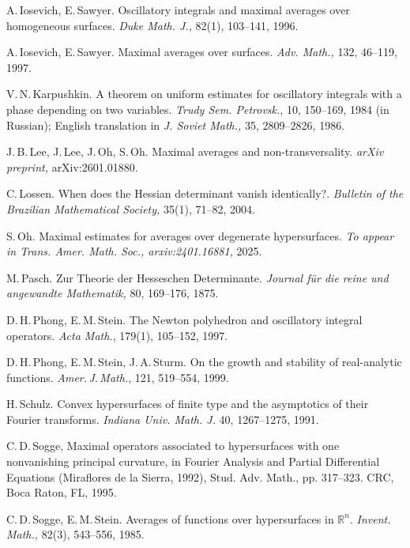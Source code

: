 \documentclass[a4paper, 11pt]{article}
\theoremstyle{plain}
\theoremstyle{definition}
\theoremstyle{lemma}
\theoremstyle{Remark}
\theoremstyle{proposition}
\theoremstyle{corollary}
\theoremstyle{example}
\theoremstyle{assumption}
\begin{document}
\begin{thebibliography}{}
 A.\,Iosevich, E.\,Sawyer. Oscillatory integrals and maximal averages over homogeneous surfaces. \textit{Duke Math. J.,} 82(1), 103--141, 1996.


 A.\,Iosevich,  E.\,Sawyer. Maximal averages over surfaces. \textit{Adv. Math.,} 132, 46--119, 1997.

 V.\,N.\,Karpushkin. A theorem on uniform estimates for oscillatory integrals with a phase depending on two variables. \textit{Trudy Sem. Petrovsk.}, 10, 150--169, 1984 (in Russian); English translation
in \textit{J. Soviet Math.,} 35, 2809--2826, 1986.


 J.\,B.\,Lee, J.\,Lee, J.\,Oh, S.\,Oh. Maximal averages and non-transversality. \textit{arXiv preprint,} arXiv:2601.01880.

 C.\,Lossen.  When does the Hessian determinant vanish identically?.
\textit{ Bulletin of the
Brazilian Mathematical Society,} 35(1), 71--82, 2004.

 S.\,Oh. Maximal estimates for averages over degenerate hypersurfaces. \textit{To appear in Trans. Amer. Math. Soc., arxiv:2401.16881,} 2025.


 M.\,Pasch. Zur Theorie der Hesseschen Determinante. \textit{ Journal f\"ur die reine und angewandte Mathematik,} 80, 169--176, 1875.

 D.\,H.\,Phong, E.\,M.\,Stein. The Newton polyhedron and oscillatory integral operators. \textit{Acta Math.}, 179(1), 105--152, 1997.

D.\,H.\,Phong, E.\,M.\,Stein,  J.\,A.\,Sturm. On the growth and stability of real-analytic
functions. \textit{Amer.\,J.\,Math.}, 121, 519--554, 1999.

 H.\,Schulz. Convex hypersurfaces of finite type and the asymptotics of their Fourier transforms. \textit{Indiana Univ. Math. J.} 40, 1267--1275, 1991.

 C.\,D.\,Sogge,  Maximal operators associated to hypersurfaces with one nonvanishing principal curvature,
in Fourier Analysis and Partial Differential Equations (Miraflores de la Sierra,
1992), Stud. Adv. Math., pp. 317--323. CRC, Boca Raton, FL, 1995.

 C.\,D.\,Sogge, E.\,M.\,Stein. Averages of functions over hypersurfaces in $\mathbb{R}^n.$  \textit{Invent. Math.,}
82(3), 543--556, 1985.



\end{thebibliography}
\end{document}
